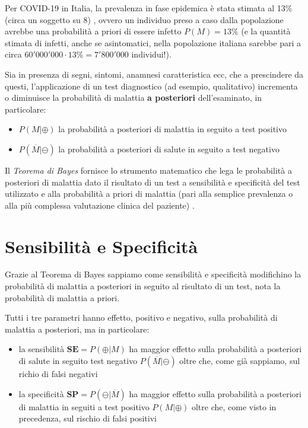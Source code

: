 \documentclass[11pt]{article}
\providecommand{\tightlist}{%
      \setlength{\itemsep}{0pt}\setlength{\parskip}{0pt}}
\begin{document}
Per COVID-19 in Italia, la prevalenza in fase epidemica è stata stimata
al 13\% (circa un soggetto su 8) \cite{ceylan2020estimation}
\cite{vollmer2020sub} \cite{flaxman2020report}, ovvero un individuo
preso a caso dalla popolazione avrebbe una probabilità a priori di
essere infetto \(P(M)=13\%\) (e la quantità stimata di infetti, anche se
asintomatici, nella popolazione italiana sarebbe pari a circa
\(60'000'000 \cdot 13\% = 7'800'000\) individui!).

Sia in presenza di segni, sintomi, anamnesi caratteristica ecc, che a
prescindere da questi, l'applicazione di un test diagnostico (ad
esempio, qualitativo) incrementa o diminuisce la probabilità di malattia
\textbf{a posteriori} dell'esaminato, in particolare:

\begin{itemize}
\tightlist
\item
  \(P(M|\oplus)\) la probabilità a posteriori di malattia in seguito a
  test positivo
\item
  \(P(\overline{M}|\ominus)\) la probabilità a posteriori di salute in
  seguito a test negativo
\end{itemize}

Il \emph{Teorema di Bayes} fornisce lo strumento matematico che lega le
probabilità a posteriori di malattia dato il risultato di un test a
sensibilità e specificità del test utilizzato e alla probabilità a
priori di malattia (pari alla semplice prevalenza o alla più complessa
valutazione clinica del paziente) \cite{kruschke2014doing}.

    \hypertarget{sensibilituxe0-e-specificituxe0}{%
\section{Sensibilità e
Specificità}\label{sensibilituxe0-e-specificituxe0}}

Grazie al Teorema di Bayes sappiamo come sensibilità e specificità
modifichino la probabilità di malattia a posteriori in seguito al
risultato di un test, nota la probabilità di malattia a priori.

Tutti i tre parametri hanno effetto, positivo e negativo, sulla
probabilità di malattia a posteriori, ma in particolare:

\begin{itemize}
\tightlist
\item
  la sensibilità \(\mathbf{SE}=P(\oplus|M)\) ha maggior effetto sulla
  probabilità a posteriori di salute in seguito test negativo
  \(P(\overline{M}|\ominus)\) oltre che, come già sappiamo, sul richio
  di falsi negativi
\item
  la specificità \(\mathbf{SP}=P(\ominus|\overline{M})\) ha maggior
  effetto sulla probabilità a posteriori di malattia in seguiti a test
  positivo \(P(M|\oplus)\) oltre che, come visto in precedenza, sul
  rischio di falsi positivi
\end{itemize}
\end{document}
